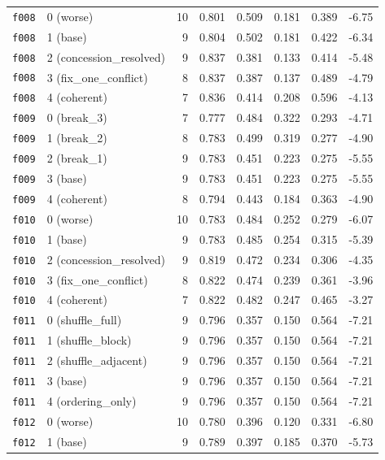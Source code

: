 \documentclass[11pt]{article}
\begin{document}
\begin{table}[htbp]
\begin{tabular}{llrrrrrr}
\midrule
\texttt{f008} & 0 (worse) & 10 & 0.801 & 0.509 & 0.181 & 0.389 & -6.75 \\
\texttt{f008} & 1 (base) & 9 & 0.804 & 0.502 & 0.181 & 0.422 & -6.34 \\
\texttt{f008} & 2 (concession\_resolved) & 9 & 0.837 & 0.381 & 0.133 & 0.414 & -5.48 \\
\texttt{f008} & 3 (fix\_one\_conflict) & 8 & 0.837 & 0.387 & 0.137 & 0.489 & -4.79 \\
\texttt{f008} & 4 (coherent) & 7 & 0.836 & 0.414 & 0.208 & 0.596 & -4.13 \\
\midrule
\texttt{f009} & 0 (break\_3) & 7 & 0.777 & 0.484 & 0.322 & 0.293 & -4.71 \\
\texttt{f009} & 1 (break\_2) & 8 & 0.783 & 0.499 & 0.319 & 0.277 & -4.90 \\
\texttt{f009} & 2 (break\_1) & 9 & 0.783 & 0.451 & 0.223 & 0.275 & -5.55 \\
\texttt{f009} & 3 (base) & 9 & 0.783 & 0.451 & 0.223 & 0.275 & -5.55 \\
\texttt{f009} & 4 (coherent) & 8 & 0.794 & 0.443 & 0.184 & 0.363 & -4.90 \\
\midrule
\texttt{f010} & 0 (worse) & 10 & 0.783 & 0.484 & 0.252 & 0.279 & -6.07 \\
\texttt{f010} & 1 (base) & 9 & 0.783 & 0.485 & 0.254 & 0.315 & -5.39 \\
\texttt{f010} & 2 (concession\_resolved) & 9 & 0.819 & 0.472 & 0.234 & 0.306 & -4.35 \\
\texttt{f010} & 3 (fix\_one\_conflict) & 8 & 0.822 & 0.474 & 0.239 & 0.361 & -3.96 \\
\texttt{f010} & 4 (coherent) & 7 & 0.822 & 0.482 & 0.247 & 0.465 & -3.27 \\
\midrule
\texttt{f011} & 0 (shuffle\_full) & 9 & 0.796 & 0.357 & 0.150 & 0.564 & -7.21 \\
\texttt{f011} & 1 (shuffle\_block) & 9 & 0.796 & 0.357 & 0.150 & 0.564 & -7.21 \\
\texttt{f011} & 2 (shuffle\_adjacent) & 9 & 0.796 & 0.357 & 0.150 & 0.564 & -7.21 \\
\texttt{f011} & 3 (base) & 9 & 0.796 & 0.357 & 0.150 & 0.564 & -7.21 \\
\texttt{f011} & 4 (ordering\_only) & 9 & 0.796 & 0.357 & 0.150 & 0.564 & -7.21 \\
\midrule
\texttt{f012} & 0 (worse) & 10 & 0.780 & 0.396 & 0.120 & 0.331 & -6.80 \\
\texttt{f012} & 1 (base) & 9 & 0.789 & 0.397 & 0.185 & 0.370 & -5.73 \\

\end{tabular}
\end{table}
\end{document}
